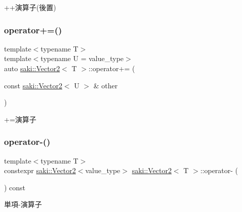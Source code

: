 ++演算子(後置) 

\mbox{\label{classsaki_1_1_vector2_aeb7ee155c7e6ae8b6c880245c6d943c1}} 
\subsubsection{\texorpdfstring{operator+=()}{operator+=()}}
{\footnotesize\ttfamily template$<$typename T$>$ \\
template$<$typename U  = value\+\_\+type$>$ \\
auto \mbox{\hyperlink{classsaki_1_1_vector2}{saki\+::\+Vector2}}$<$ T $>$\+::operator+= (\begin{DoxyParamCaption}\item[{const \mbox{\hyperlink{classsaki_1_1_vector2}{saki\+::\+Vector2}}$<$ U $>$ \&}]{other }\end{DoxyParamCaption})\hspace{0.3cm}{\ttfamily [inline]}}



+=演算子 

\mbox{\label{classsaki_1_1_vector2_ad3b4cfcb39825f88e7176ebaaf580d7f}} 
\subsubsection{\texorpdfstring{operator-\/()}{operator-()}}
{\footnotesize\ttfamily template$<$typename T$>$ \\
constexpr \mbox{\hyperlink{classsaki_1_1_vector2}{saki\+::\+Vector2}}$<$value\+\_\+type$>$ \mbox{\hyperlink{classsaki_1_1_vector2}{saki\+::\+Vector2}}$<$ T $>$\+::operator-\/ (\begin{DoxyParamCaption}{ }\end{DoxyParamCaption}) const\hspace{0.3cm}{\ttfamily [inline]}}



単項-\/演算子 

\mbox{\label{classsaki_1_1_vector2_a893f021366238f8b1c45da7ae558dd5c}} 
